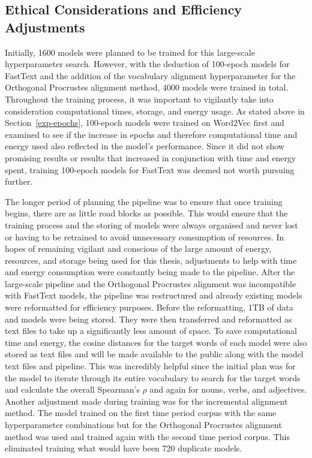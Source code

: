 \subsection{Ethical Considerations and Efficiency Adjustments}
\label{exp-ethics}
Initially, 1600 models were planned to be trained for this large-scale hyperparameter search. However, with the deduction of 100-epoch models for FastText and the addition of the vocabulary alignment hyperparameter for the Orthogonal Procrustes alignment method, 4000 models were trained in total. Throughout the training process, it was important to vigilantly take into consideration computational times, storage, and energy usage. As stated above in Section~\ref{exp-epochs}, 100-epoch models were trained on Word2Vec first and examined to see if the increase in epochs and therefore computational time and energy used also reflected in the model’s performance. Since it did not show promising results or results that increased in conjunction with time and energy spent, training 100-epoch models for FastText was deemed not worth pursuing further. 

The longer period of planning the pipeline was to ensure that once training begins, there are as little road blocks as possible. This would ensure that the training process and the storing of models were always organised and never lost or having to be retrained to avoid unnecessary consumption of resources. In hopes of remaining vigilant and conscious of the large amount of energy, resources, and storage being used for this thesis, adjustments to help with time and energy consumption were constantly being made to the pipeline. After the large-scale pipeline and the Orthogonal Procrustes alignment was incompatible with FastText models, the pipeline was restructured and already existing models were reformatted for efficiency purposes. Before the reformatting, 1TB of data and models were being stored. They were then transferred and reformatted as text files to take up a significantly less amount of space. To save computational time and energy, the cosine distances for the target words of each model were also stored as text files and will be made available to the public along with the model text files and pipeline. This was incredibly helpful since the initial plan was for the model to iterate through its entire vocabulary to search for the target words and calculate the overall Spearman’s $\rho$ and again for nouns, verbs, and adjectives. Another adjustment made during training was for the incremental alignment method. The model trained on the first time period corpus with the same hyperparameter combinations but for the Orthogonal Procrustes alignment method was used and trained again with the second time period corpus. This eliminated training what would have been 720 duplicate models.  

